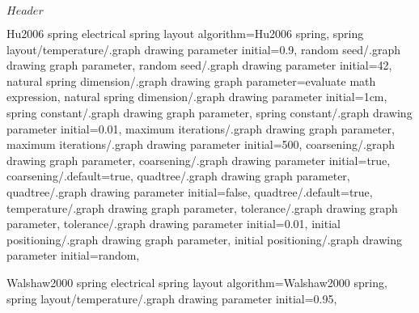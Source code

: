 %
%
%

\ProvidesFileRCS[v\pgfversion] $Header$





%
% 







%
%



%
% 
%
\pgfgddeclarealgorithmkey
  {Hu2006 spring electrical}
  {spring layout}
  {
    algorithm=Hu2006 spring,
    spring layout/temperature/.graph drawing parameter initial=0.9,
  }
  {
    random seed/.graph drawing graph parameter,
    random seed/.graph drawing parameter initial=42,
    natural spring dimension/.graph drawing graph parameter=evaluate math expression,
    natural spring dimension/.graph drawing parameter initial=1cm,
    spring constant/.graph drawing graph parameter,
    spring constant/.graph drawing parameter initial=0.01,
    maximum iterations/.graph drawing graph parameter,
    maximum iterations/.graph drawing parameter initial=500,
    coarsening/.graph drawing graph parameter,
    coarsening/.graph drawing parameter initial=true,
    coarsening/.default=true,
    quadtree/.graph drawing graph parameter,
    quadtree/.graph drawing parameter initial=false,
    quadtree/.default=true,
    temperature/.graph drawing graph parameter,
    tolerance/.graph drawing graph parameter,
    tolerance/.graph drawing parameter initial=0.01,
    initial positioning/.graph drawing graph parameter,
    initial positioning/.graph drawing parameter initial=random,
  }



%
%
%
\pgfgddeclarealgorithmkey
  {Walshaw2000 spring electrical}
  {spring layout}
  {
    algorithm=Walshaw2000 spring,
    spring layout/temperature/.graph drawing parameter initial=0.95,
  }
  {}
